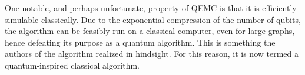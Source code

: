 
One notable, and perhaps unfortunate, property of QEMC is that it is efficiently simulable classically. Due to the exponential compression of the number of qubits, the algorithm can be feasibly run on a classical computer, even for large graphs, hence defeating its purpose as a quantum algorithm. This is something the authors of the algorithm \cite{tenecohen2023variational} realized in hindsight. For this reason, it is now termed a quantum-inspired classical algorithm.


